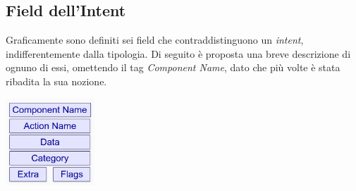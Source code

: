 \documentclass{article}
\begin{document}
\subsection*{Field dell'Intent}
Graficamente sono definiti sei field che contraddistinguono un \textit{intent}, indifferentemente dalla tipologia. Di seguito è proposta una breve descrizione di ognuno di essi, omettendo il tag \textit{Component Name}, dato che più volte è stata ribadita la sua nozione.\\
\begin{center}
    \includegraphics[width=0.25\textwidth]{foto1.png}
\end{center}
\end{document}
